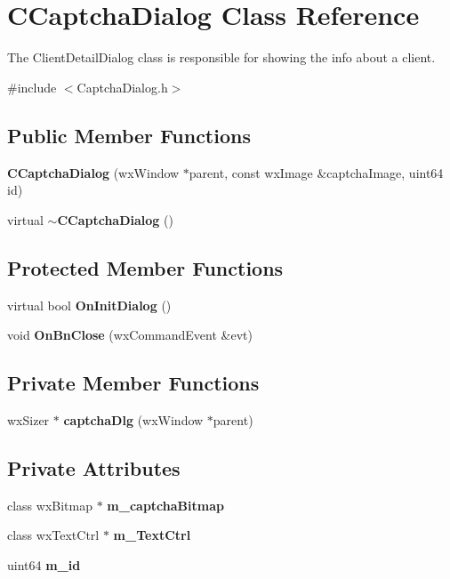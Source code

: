 \section{CCaptchaDialog Class Reference}
\label{classCCaptchaDialog}


The ClientDetailDialog class is responsible for showing the info about a client.  


{\ttfamily \#include $<$CaptchaDialog.h$>$}\subsection*{Public Member Functions}
\begin{DoxyCompactItemize}
\item 
{\bf CCaptchaDialog} (wxWindow $\ast$parent, const wxImage \&captchaImage, uint64 id)
\item 
virtual {\bf $\sim$CCaptchaDialog} ()\label{classCCaptchaDialog_a2c0602cad88db102798ebd44147e7a4e}

\end{DoxyCompactItemize}
\subsection*{Protected Member Functions}
\begin{DoxyCompactItemize}
\item 
virtual bool {\bf OnInitDialog} ()
\item 
void {\bf OnBnClose} (wxCommandEvent \&evt)
\end{DoxyCompactItemize}
\subsection*{Private Member Functions}
\begin{DoxyCompactItemize}
\item 
wxSizer $\ast$ {\bfseries captchaDlg} (wxWindow $\ast$parent)\label{classCCaptchaDialog_afa748cbb8f6e68e0effbb33faac6a373}

\end{DoxyCompactItemize}
\subsection*{Private Attributes}
\begin{DoxyCompactItemize}
\item 
class wxBitmap $\ast$ {\bfseries m\_\-captchaBitmap}\label{classCCaptchaDialog_aa3b43c06c8fa7ec0e2fc63d9a016fb27}

\item 
class wxTextCtrl $\ast$ {\bfseries m\_\-TextCtrl}\label{classCCaptchaDialog_aba4029a60dfae8be1f373fdfd69894f7}

\item 
uint64 {\bfseries m\_\-id}\label{classCCaptchaDialog_a3bfbf3eeab8db7af5f8f1729f5d99813}

\end{DoxyCompactItemize}


